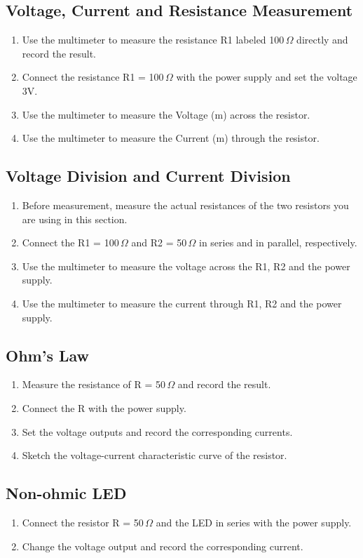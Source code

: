 \documentclass{article}
\begin{document}
	\subsection{Voltage, Current and Resistance Measurement}
	\begin{enumerate}
	\item Use the multimeter to measure the resistance R1 labeled 100$\,\Omega$ directly and record the result.
	\item Connect the resistance R1 = 100$\,\Omega$ with the power supply and set the voltage 3V.
	\item Use the multimeter to measure the Voltage (m) across the resistor.
	\item Use the multimeter to measure the Current (m) through the resistor.
	\end{enumerate}
	
	\subsection{Voltage Division and Current Division}
	\begin{enumerate}
	\item Before measurement, measure the actual resistances of the two resistors you are using in this section.
	\item Connect the R1 = 100$\,\Omega$ and R2 = 50$\,\Omega$ in series and in parallel, respectively.
	\item Use the multimeter to measure the voltage across the R1, R2 and the power supply.
	\item Use the multimeter to measure the current through R1, R2 and the power supply.
	\end{enumerate}
	
	\subsection{Ohm's Law}
	\begin{enumerate}
	\item  Measure the resistance of R = 50$\,\Omega$ and record the result.
	\item Connect the R with the power supply.
	\item Set the voltage outputs and record the corresponding currents.
	\item Sketch the voltage-current characteristic curve of the resistor.
	\end{enumerate}
	
	\subsection{Non-ohmic LED}
	\begin{enumerate}
	\item Connect the resistor R = 50$\,\Omega$ and the LED in series with the power supply.
	\item Change the voltage output and record the corresponding current.
	\end{enumerate}
	
\end{document}
